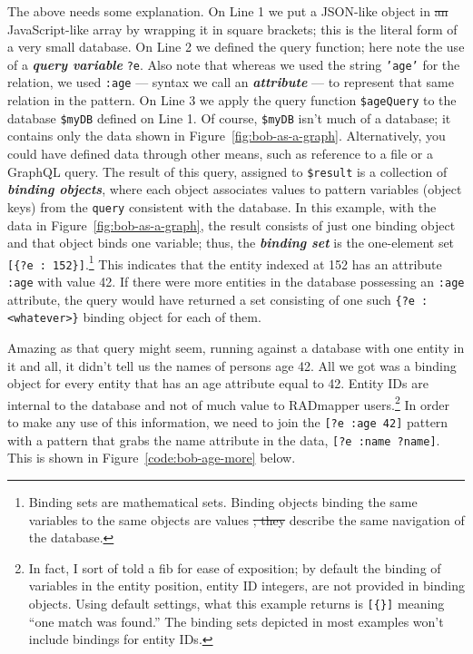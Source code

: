 \documentclass[10pt,letterpaper]{article} %
\newcommand{\stt}[1]{\texttt{#1}} %
\newcommand{\bdef}[1]{\textbf{\textit{#1}}}
\providecommand{\DIFadd}[1]{{\protect\color{blue}\uwave{#1}}} %
\providecommand{\DIFdel}[1]{{\protect\color{red}\sout{#1}}}                      %
\providecommand{\DIFaddbegin}{} %
\providecommand{\DIFaddend}{} %
\providecommand{\DIFdelbegin}{} %
\providecommand{\DIFdelend}{} %
\newcommand{\DIFscaledelfig}{0.5}
\newlength{\DIFdelgraphicswidth} %
\newlength{\DIFdelgraphicsheight} %
\newcommand{\DIFaddincludegraphics}[2][]{{\color{blue}\fbox{\DIFOincludegraphics[#1]{#2}}}} %
\newcommand{\DIFdelincludegraphics}[2][]{%
\sbox{\DIFdelgraphicsbox}{\DIFOincludegraphics[#1]{#2}}%
\settoboxwidth{\DIFdelgraphicswidth}{\DIFdelgraphicsbox} %
\settoboxtotalheight{\DIFdelgraphicsheight}{\DIFdelgraphicsbox} %
\scalebox{\DIFscaledelfig}{%
\parbox[b]{\DIFdelgraphicswidth}{\usebox{\DIFdelgraphicsbox}\\[-\baselineskip] \rule{\DIFdelgraphicswidth}{0em}}\llap{\resizebox{\DIFdelgraphicswidth}{\DIFdelgraphicsheight}{%
\setlength{\unitlength}{\DIFdelgraphicswidth}%
\begin{picture}(1,1)%
\thicklines\linethickness{2pt} %
{\color[rgb]{1,0,0}\put(0,0){\framebox(1,1){}}}%
{\color[rgb]{1,0,0}\put(0,0){\line( 1,1){1}}}%
{\color[rgb]{1,0,0}\put(0,1){\line(1,-1){1}}}%
\end{picture}%
}\hspace*{3pt}}} %
} %
\DeclareRobustCommand{\DIFaddbegin}{\DIFOaddbegin \let\includegraphics\DIFaddincludegraphics} %
\DeclareRobustCommand{\DIFaddend}{\DIFOaddend \let\includegraphics\DIFOincludegraphics} %
\DeclareRobustCommand{\DIFdelbegin}{\DIFOdelbegin \let\includegraphics\DIFdelincludegraphics} %
\DeclareRobustCommand{\DIFdelend}{\DIFOaddend \let\includegraphics\DIFOincludegraphics} %
\begin{document}
The above needs some explanation.
On Line 1 we put a JSON-like object in \DIFdelbegin \DIFdel{an }\DIFdelend \DIFaddbegin \DIFadd{a }\DIFaddend JavaScript-like array by wrapping it in square brackets; this is the literal form of a very small database.
On Line 2 we defined the query function; here note the use of a \bdef{query variable} \stt{?e}.
Also note that whereas we used the string \stt{'age'} for the relation, we used \stt{:age} --- syntax we call an \bdef{attribute} --- to represent that same relation in the pattern.
On Line 3 we apply the query function \stt{\$ageQuery} to the database \stt{\$myDB} defined on Line 1.
Of course, \stt{\$myDB} isn't much of a database; it contains only the data shown in Figure~\ref{fig:bob-as-a-graph}.
Alternatively, you could have defined data through other means, such as reference to a file or a GraphQL query.
The result of this query, assigned to \stt{\$result} is a collection of \bdef{binding objects}, where each
object associates values to pattern variables (object keys) from the \stt{query} consistent with the database.
In this example, with the data in Figure~\ref{fig:bob-as-a-graph}, the result consists of just one binding object and that object binds one variable;
thus, the \bdef{binding  set} is the one-element set \stt{[\{?e : 152\}]}.\footnote{Binding sets are mathematical sets. Binding objects binding the same variables to the same objects are values \DIFdelbegin \DIFdel{; they }\DIFdelend describe the same navigation of the database.}
This indicates that the entity indexed at 152 has an attribute \stt{:age} with value 42.
If there were more entities in the database possessing an \stt{:age} attribute, the query would have returned a set consisting of one such \stt{\{?e : <whatever>\}} binding object for each of them.

Amazing as that query might seem, running against a database with one entity in it and all, it didn't tell us the names of persons age 42.
All we got was a binding object for every entity that has an age attribute equal to 42.
Entity IDs are internal to the database and not of much value to RADmapper users.\footnote{In fact, I sort of told a fib for ease of exposition; by default the binding of variables in the entity position, entity ID integers, are not provided in binding objects.
  Using default settings, what this example returns is \stt{[\{\}]} meaning ``one match was found.''
The binding sets depicted in most examples won't include bindings for entity IDs.}
In order to make any use of this information, we need to join the \stt{[?e :age 42]} pattern with a pattern that grabs the name attribute in the data, \stt{[?e :name ?name]}.
This is shown in Figure~\ref{code:bob-age-more} below.
\end{document}
